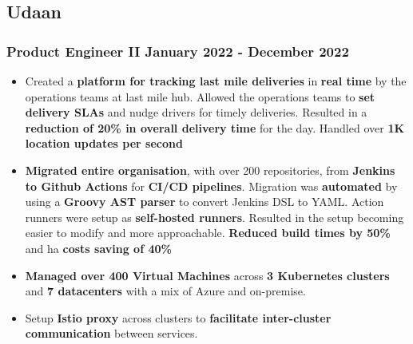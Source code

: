\documentclass[12pt]{article}
\newcommand{\experienceItem}{\item [-] \small}
\newcommand{\spacedSubSubSection}[2]{\subsubsection {{#1} \hspace*{\fill} {#2}}}
\begin{document}
{        \subsection{Udaan}
        {
            \spacedSubSubSection{Product Engineer II}{January 2022 - December 2022}
            {
                {
                    \begin{itemize}[itemsep=0.1ex, leftmargin=6ex, rightmargin=1ex]
                        \experienceItem
                        {
                            Created a \textbf {platform for tracking last mile deliveries} in \textbf {real time} by the
                            operations teams at last mile hub. Allowed the operations teams to \textbf {set delivery SLAs} and
                            nudge drivers for timely deliveries. Resulted in a \textbf {reduction of 20\% in overall delivery time}
                            for the day. Handled over \textbf {1K location updates per second}
                        }
                        \experienceItem
                        {
                            \textbf {Migrated entire organisation}, with over 200 repositories, from \textbf {Jenkins to Github Actions}
                            for \textbf {CI/CD pipelines}. Migration was \textbf {automated} by using a \textbf {Groovy AST parser} to convert Jenkins
                            DSL to YAML. Action runners were setup as \textbf {self-hosted runners}. Resulted in the setup
                            becoming easier to modify and more approachable. \textbf {Reduced build times by 50\%} and ha
                            \textbf {costs saving of 40\%}
                        }
                        \experienceItem
                        {
                            \textbf {Managed over 400 Virtual Machines} across \textbf {3 Kubernetes clusters} and
                            \textbf {7 datacenters} with a mix of Azure and on-premise.
                        }
                        \experienceItem
                        {
                            Setup \textbf {Istio proxy} across clusters to \textbf {facilitate inter-cluster communication}
                            between services.
                        }
                \end{itemize}
            }

}}}
\end{document}
